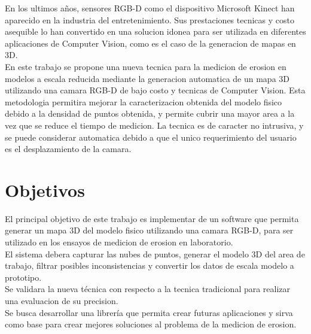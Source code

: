 En los ultimos a\~{n}os, sensores RGB-D como el dispositivo Microsoft Kinect han aparecido en la industria del entretenimiento. Sus prestaciones tecnicas y costo asequible lo han convertido en una solucion idonea para ser utilizada en diferentes aplicaciones de Computer Vision, como es el caso de la generacion de mapas en 3D. \\

En este trabajo se propone una nueva tecnica para la medicion de erosion en modelos a escala reducida mediante la generacion automatica de un mapa 3D utilizando una camara 
RGB-D de bajo costo y tecnicas de Computer Vision. Esta metodologia permitira mejorar la caracterizacion obtenida del modelo fisico debido a la densidad de puntos obtenida, y permite cubrir una mayor area a la vez que se reduce el tiempo de medicion. La tecnica es de caracter no intrusiva, y se puede considerar automatica debido a que el unico requerimiento del usuario es el desplazamiento de la camara.
\section{Objetivos}
\label{S:objetivos}
El principal objetivo de este trabajo es implementar de un software que permita generar un mapa 3D del modelo fisico utilizando una camara RGB-D, para ser utilizado en los ensayos de medicion de erosion en laboratorio. \\
El sistema debera capturar las nubes de puntos, generar el modelo 3D del area de trabajo, filtrar posibles inconsistencias y convertir los datos de escala modelo a prototipo. \\
Se validara la nueva t\'{e}cnica con respecto a la tecnica tradicional para realizar una evaluacion de su precision. \\
Se busca desarrollar una librer\'{i}a que permita crear futuras aplicaciones y sirva como base para crear mejores soluciones al problema de la medicion de erosion.


